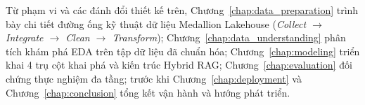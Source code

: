 Từ phạm vi và các đánh đổi thiết kế trên, Chương~\ref{chap:data_preparation} trình bày chi tiết đường ống kỹ thuật dữ liệu Medallion Lakehouse (\textit{Collect $\rightarrow$ Integrate $\rightarrow$ Clean $\rightarrow$ Transform}); Chương~\ref{chap:data_understanding} phân tích khám phá EDA trên tập dữ liệu đã chuẩn hóa; Chương~\ref{chap:modeling} triển khai 4 trụ cột khai phá và kiến trúc Hybrid RAG; Chương~\ref{chap:evaluation} đối chứng thực nghiệm đa tầng; trước khi Chương~\ref{chap:deployment} và Chương~\ref{chap:conclusion} tổng kết vận hành và hướng phát triển.
